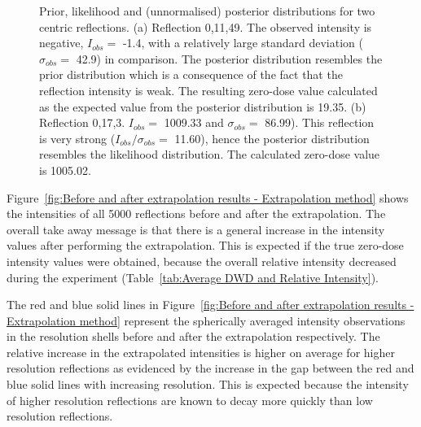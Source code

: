 \begin{figure}
        \caption{Prior, likelihood and (unnormalised) posterior distributions for two centric reflections.
		(a) Reflection 0,11,49. The observed intensity is negative, $I_{obs} =$ -1.4, with a relatively large standard deviation ($\sigma_{obs} =$ 42.9) in comparison.
		The posterior distribution resembles the prior distribution which is a consequence of the fact that the reflection intensity is weak.
		The resulting zero-dose value calculated as the expected value from the posterior distribution is 19.35.
		(b) Reflection 0,17,3. $I_{obs} =$ 1009.33 and $\sigma_{obs} =$ 86.99).
		This reflection is very strong ($I_{obs}/\sigma_{obs}  =$ 11.60), hence the posterior distribution resembles the likelihood distribution.
		The calculated zero-dose value is 1005.02.}
        \label{fig:Probabilistic distributions - Extrapolation method}
\end{figure}

Figure~\ref{fig:Before and after extrapolation results - Extrapolation method}  shows the intensities of all 5000 reflections before and after the extrapolation.
The overall take away message is that there is a general increase in the intensity values after performing the extrapolation.
This is expected if the true zero-dose intensity values were obtained, because the overall relative intensity decreased during the experiment (Table~\ref{tab:Average DWD and Relative Intensity}).

The red and blue solid lines in Figure~\ref{fig:Before and after extrapolation results - Extrapolation method} represent the spherically averaged intensity observations in the resolution shells before and after the extrapolation respectively.
The relative increase in the extrapolated intensities is higher on average for higher resolution reflections as evidenced by the increase in the gap between the red and blue solid lines with increasing resolution.
This is expected because the intensity of higher resolution reflections are known to decay more quickly than low resolution reflections.

